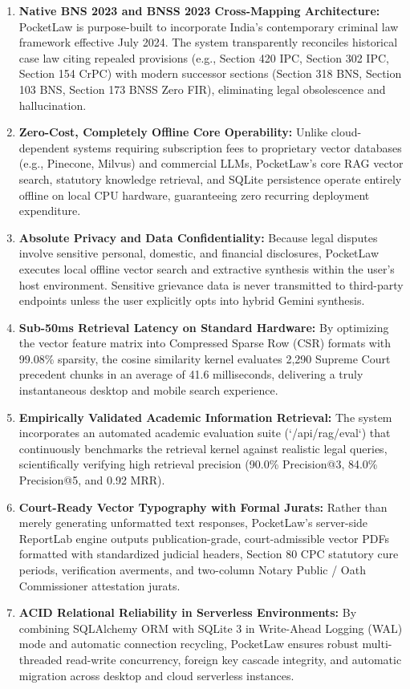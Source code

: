 \begin{enumerate}
    \item \textbf{Native BNS 2023 and BNSS 2023 Cross-Mapping Architecture:}
    PocketLaw is purpose-built to incorporate India's contemporary criminal law framework effective July 2024. The system transparently reconciles historical case law citing repealed provisions (e.g., Section 420 IPC, Section 302 IPC, Section 154 CrPC) with modern successor sections (Section 318 BNS, Section 103 BNS, Section 173 BNSS Zero FIR), eliminating legal obsolescence and hallucination.
    
    \item \textbf{Zero-Cost, Completely Offline Core Operability:}
    Unlike cloud-dependent systems requiring subscription fees to proprietary vector databases (e.g., Pinecone, Milvus) and commercial LLMs, PocketLaw's core RAG vector search, statutory knowledge retrieval, and SQLite persistence operate entirely offline on local CPU hardware, guaranteeing zero recurring deployment expenditure.
    
    \item \textbf{Absolute Privacy and Data Confidentiality:}
    Because legal disputes involve sensitive personal, domestic, and financial disclosures, PocketLaw executes local offline vector search and extractive synthesis within the user's host environment. Sensitive grievance data is never transmitted to third-party endpoints unless the user explicitly opts into hybrid Gemini synthesis.
    
    \item \textbf{Sub-50ms Retrieval Latency on Standard Hardware:}
    By optimizing the vector feature matrix into Compressed Sparse Row (CSR) formats with 99.08\% sparsity, the cosine similarity kernel evaluates 2,290 Supreme Court precedent chunks in an average of 41.6 milliseconds, delivering a truly instantaneous desktop and mobile search experience.
    
    \item \textbf{Empirically Validated Academic Information Retrieval:}
    The system incorporates an automated academic evaluation suite (`/api/rag/eval`) that continuously benchmarks the retrieval kernel against realistic legal queries, scientifically verifying high retrieval precision (90.0\% Precision@3, 84.0\% Precision@5, and 0.92 MRR).
    
    \item \textbf{Court-Ready Vector Typography with Formal Jurats:}
    Rather than merely generating unformatted text responses, PocketLaw's server-side ReportLab engine outputs publication-grade, court-admissible vector PDFs formatted with standardized judicial headers, Section 80 CPC statutory cure periods, verification averments, and two-column Notary Public / Oath Commissioner attestation jurats.
    
    \item \textbf{ACID Relational Reliability in Serverless Environments:}
    By combining SQLAlchemy ORM with SQLite 3 in Write-Ahead Logging (WAL) mode and automatic connection recycling, PocketLaw ensures robust multi-threaded read-write concurrency, foreign key cascade integrity, and automatic migration across desktop and cloud serverless instances.
\end{enumerate}
